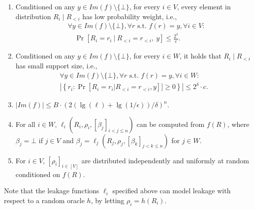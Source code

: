 \begin{theorem} 
\begin{enumerate}
    for all $i \in [W]$, $\beta_i = \ell_i(R_i, \rho_i, [\beta_j]_{i < j \leq n})$.
    We require that the number of valid sequences
    $\beta_1, \ldots, \beta_n$ is at most $B$.
    \item 
    Conditioned on any $y \in Im(f) \setminus \{\bot\}$, 
    for every $i \in V$, every element in distribution $R_i \mid R_{<i}$ has low probability weight, i.e.,
    \begin{align*}
    &\forall y \in Im(f) \setminus \{\bot\}, \forall r \mbox{ s.t. } f(r) = y, \forall i \in V: \\
    &\quad 
    \Pr\left[R_i = r_i~ \Bigg |~R_{<i} = r_{<i},~ y\right]
    \leq  \frac{2^{\delta}}{c}.
    \end{align*}
    \item Conditioned on any $y \in Im(f) \setminus \{\bot\}$, 
    for every $i \in W$, it holds that $R_i \mid R_{<i}$ has small support size, i.e.,
    \begin{eqnarray*}
        \forall y \in Im(f) \setminus \{\bot\}, \forall r \mbox{ s.t. } f(r) =  y, \forall i \in W: \\
        \left | \left \{ r_i : \Pr[R_i = r_i|R_{<i} = r_{<i}, y]] \geq 0 \right \}  \right | \leq 2^{\delta} \cdot c.
    \end{eqnarray*}
    \item $|Im(f)| \leq  B \cdot \left ( 2(\lg(\ell) + \lg (1/\epsilon)) /\delta \right )^{n}$.
    \item For all $i \in W$, $\ell_i(R_i, \rho_i, [\beta_{j}]_{i < j \leq n})$  can be computed from $f(R)$, where
    $\beta_j = \bot$ if $j \in V$
    and $\beta_j = \ell_j(R_j, \rho_j, [\beta_k]_{j < k \leq n})$ for 
    $j \in W$.
    \item For $i \in V$, $[\rho_i]_{i \in [V]}$
    are distributed independently and uniformly at random
    conditioned on $f(R)$.
\end{enumerate}
\end{theorem}
\fi
%
Note that the leakage functions $\ell_i$ specified above 
can model leakage with respect to
a random oracle $h$, by letting $\rho_i = h(R_i)$.

